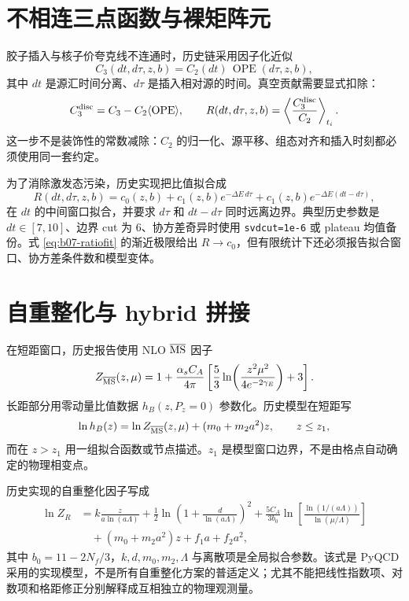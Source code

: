 \section{不相连三点函数与裸矩阵元}

胶子插入与核子价夸克线不连通时，历史链采用因子化近似
\begin{equation}
  C_3(dt,d\tau,z,b)=C_2(dt)\,\operatorname{OPE}(d\tau,z,b),
  \label{eq:b07-factorization}
\end{equation}
其中 $dt$ 是源汇时间分离、$d\tau$ 是插入相对源的时间。真空贡献需要显式扣除：
\begin{equation}
  C_3^{\rm disc}=C_3-C_2\langle \operatorname{OPE}\rangle,
  \qquad
  R(dt,d\tau,z,b)
  =\left\langle\frac{C_3^{\rm disc}}{C_2}\right\rangle_{t_i}.
  \label{eq:b07-vacuum}
\end{equation}
这一步不是装饰性的常数减除：$C_2$ 的归一化、源平移、组态对齐和插入时刻都必须使用同一套约定。

为了消除激发态污染，历史实现把比值拟合成
\begin{equation}
  R(dt,d\tau,z,b)=c_0(z,b)
  +c_1(z,b)e^{-\Delta E\,d\tau}
  +c_1(z,b)e^{-\Delta E(dt-d\tau)},
  \label{eq:b07-ratiofit}
\end{equation}
在 $dt$ 的中间窗口拟合，并要求 $d\tau$ 和 $dt-d\tau$ 同时远离边界。典型历史参数是 $dt\in[7,10]$、边界 cut 为 6、协方差奇异时使用 \texttt{svdcut=1e-6} 或 plateau 均值备份。式 \eqref{eq:b07-ratiofit} 的渐近极限给出 $R\to c_0$，但有限统计下还必须报告拟合窗口、协方差条件数和模型变体。

\section{自重整化与 hybrid 拼接}

在短距窗口，历史报告使用 NLO $\overline{\rm MS}$ 因子
\begin{equation}
  Z_{\overline{\rm MS}}(z,\mu)
  =1+\frac{\alpha_s C_A}{4\pi}
  \left[
  \frac53\ln\!\left(
  \frac{z^2\mu^2}{4e^{-2\gamma_E}}\right)+3
  \right].
  \label{eq:b07-zms}
\end{equation}
长距部分用零动量比值数据 $h_B(z,P_z=0)$ 参数化。历史模型在短距写
\begin{equation}
  \ln h_B(z)=\ln Z_{\overline{\rm MS}}(z,\mu)
  +(m_0+m_2a^2)z,
  \qquad z\le z_1,
  \label{eq:b07-hb}
\end{equation}
而在 $z>z_1$ 用一组拟合函数或节点描述。$z_1$ 是模型窗口边界，不是由格点自动确定的物理相变点。

历史实现的自重整化因子写成
\begin{align}
  \ln Z_R
  &=k\frac{z}{a\ln(a\Lambda)}
  +\frac12\ln\!\left(1+\frac{d}{\ln(a\Lambda)}\right)^2
  +\frac{5C_A}{3b_0}
  \ln\!\left[
  \frac{\ln(1/(a\Lambda))}{\ln(\mu/\Lambda)}
  \right]\nonumber\\
  &\quad +(m_0+m_2a^2)z+f_1a+f_2a^2,
  \label{eq:b07-zr}
\end{align}
其中 $b_0=11-2N_f/3$，$k,d,m_0,m_2,\Lambda$ 与离散项是全局拟合参数。该式是 PyQCD 采用的实现模型，不是所有自重整化方案的普适定义；尤其不能把线性指数项、对数项和格距修正分别解释成互相独立的物理观测量。

